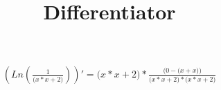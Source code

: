\documentclass{article}
\title{Differentiator}
\begin{document}
\maketitle
\begin{eqnarray}
\left( Ln\left(\frac{{1}}{{({{x}}*{{x}}}+{{2})}}\right)\right) ' = 
{{({{x}}*{{x}}}+{{2})}}*{\frac{{({0}}-{{({x}}+{{x})})}}{{{({{x}}*{{x}}}+{{2})}}*{{({{x}}*{{x}}}+{{2})}}}}\end{eqnarray}
\end{document}

